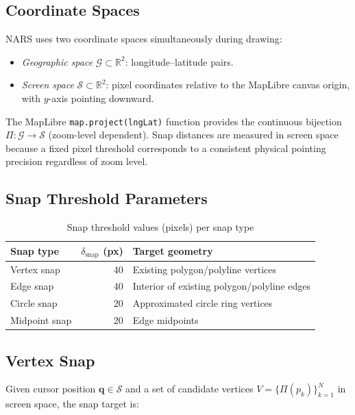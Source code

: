 \documentclass[12pt,a4paper]{article}
\theoremstyle{definition}
\theoremstyle{plain}
\theoremstyle{remark}
\newcommand{\R}{\mathbb{R}}
\newcommand{\vect}[1]{\mathbf{#1}}
\begin{document}
\subsection{Coordinate Spaces}

NARS uses two coordinate spaces simultaneously during drawing:

\begin{itemize}
  \item \emph{Geographic space} $\mathcal{G} \subset \R^2$: longitude--latitude pairs.
  \item \emph{Screen space} $\mathcal{S} \subset \R^2$: pixel coordinates relative
    to the MapLibre canvas origin, with $y$-axis pointing downward.
\end{itemize}

The MapLibre\cite{maplibre} \texttt{map.project(lngLat)} function provides the continuous
bijection $\Pi: \mathcal{G} \to \mathcal{S}$ (zoom-level dependent). Snap
distances are measured in screen space because a fixed pixel threshold
corresponds to a consistent physical pointing precision regardless of
zoom level.

\subsection{Snap Threshold Parameters}

\begin{table}[H]
\centering
\caption{Snap threshold values (pixels) per snap type}
\label{tab:snap_thresholds}
\begin{tabular}{lrl}
\toprule
\textbf{Snap type} & $\delta_{\text{snap}}$ \textbf{(px)} & \textbf{Target geometry} \\
\midrule
Vertex snap    & 40 & Existing polygon/polyline vertices \\
Edge snap      & 40 & Interior of existing polygon/polyline edges \\
Circle snap    & 20 & Approximated circle ring vertices \\
Midpoint snap  & 20 & Edge midpoints \\
\bottomrule
\end{tabular}
\end{table}

\subsection{Vertex Snap}

Given cursor position $\vect{q} \in \mathcal{S}$ and a set of candidate
vertices $V = \{\Pi(p_k)\}_{k=1}^{N}$ in screen space, the snap target is:
\end{document}
